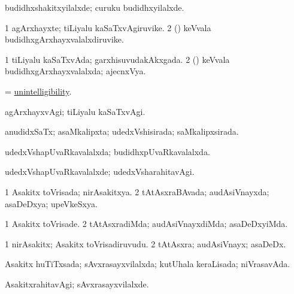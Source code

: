 \bentry
{} 
\gl{\kirxvi}
\expl{}
\bmng
budidhxshakitxyilalxde; curuku budidhxyilalxde. 
\emng
\eentry

\bentry
{} 
\gl{\nA}
\expl{}
\bmng
\bnum
\num{1} agArxhayxte; tiLiyalu kaSaTxvAgiruvike. 
\num{2} (\tashA) keVvala budidhxgArxhayxvalalxdiruvike. 
\enum
\emng
\eentry

\bentry
{} 
\gl{\gu}
\expl{}
\bmng
\bnum
\num{1} tiLiyalu kaSaTxvAda; garxhisuvudakAkxgada. 
\num{2} (\tashA) keVvala budidhxgArxhayxvalalxda; ajecnxVya. 
\enum
\emng
\eentry

\bentry
{} 
\gl{\nA}
\expl{}
\bmng
= \hyperlink{unintelligibility}{unintelligibility}. 
\emng
\eentry

\bentry
{} 
\gl{\kirxvi}
\expl{}
\bmng
agArxhayxvAgi; tiLiyalu kaSaTxvAgi. 
\emng
\eentry

\bentry
{} 
\gl{\gu}
\expl{}
\bmng
anudidxSaTx; asaMkalipxta; udedxVshisirada; saMkalipxsirada. 
\emng
\eentry

\bentry
{} 
\gl{\gu}
\expl{}
\bmng
udedxVshapUvaRkavalalxda; budidhxpUvaRkavalalxda. 
\emng
\eentry

\bentry
{} 
\gl{\kirxvi}
\expl{}
\bmng
udedxVshapUvaRkavalalxde; udedxVsharahitavAgi. 
\emng
\eentry

\bentry
{} 
\gl{\gu}
\expl{}
\bmng
\bnum
\num{1} Asakitx toVrisada; nirAsakitxya. 
\num{2} tAtAsxraBAvada; audAsiVnayxda; asaDeDxya; upeVkeSxya. 
\enum
\emng
\eentry

\bentry
{} 
\gl{\kirxvi}
\expl{}
\bmng
\bnum
\num{1} Asakitx toVrisade. 
\num{2} tAtAsxradiMda; audAsiVnayxdiMda; asaDeDxyiMda. 
\enum
\emng
\eentry

\bentry
{} 
\gl{\nA}
\expl{}
\bmng
\bnum
\num{1} nirAsakitx; Asakitx toVrisadiruvudu. 
\num{2} tAtAsxra; audAsiVnayx; asaDeDx. 
\enum
\emng
\eentry

\bentry
{} 
\gl{\gu}
\expl{}
\bmng
Asakitx huTiTxsada; sAvxrasayxvilalxda; kutUhala keraLisada; niVrasavAda. 
\emng
\eentry

\bentry
{} 
\gl{\kirxvi}
\expl{}
\bmng
AsakitxrahitavAgi; sAvxrasayxvilalxde. 
\emng
\eentry


